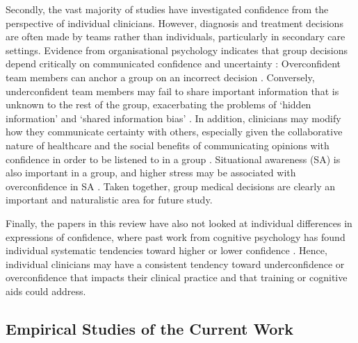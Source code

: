 \documentclass[a4paper, nobind]{templates/ociamthesis}
\begin{document}
\hfill\break
Secondly, the vast majority of studies have investigated confidence from the perspective of individual clinicians. However, diagnosis and treatment decisions are often made by teams rather than individuals, particularly in secondary care settings. Evidence from organisational psychology indicates that group decisions depend critically on communicated confidence and uncertainty \autocite{silver_wise_2021}: Overconfident team members can anchor a group on an incorrect decision \autocite{mahmoodi_equality_2015}. Conversely, underconfident team members may fail to share important information that is unknown to the rest of the group, exacerbating the problems of `hidden information' and `shared information bias' \autocite{stasser_pooling_1985}. In addition, clinicians may modify how they communicate certainty with others, especially given the collaborative nature of healthcare and the social benefits of communicating opinions with confidence in order to be listened to in a group \autocite{brezis_does_2019}. Situational awareness (SA) is also important in a group, and higher stress may be associated with overconfidence in SA \autocite{price_acute_2016}. Taken together, group medical decisions are clearly an important and naturalistic area for future study.

\hfill\break
Finally, the papers in this review have also not looked at individual differences in expressions of confidence, where past work from cognitive psychology has found individual systematic tendencies toward higher or lower confidence \autocite{ais_individual_2016,navajas_idiosyncratic_2017}. Hence, individual clinicians may have a consistent tendency toward underconfidence or overconfidence that impacts their clinical practice and that training or cognitive aids could address.

\subsection{Empirical Studies of the Current Work}\label{empirical-studies-of-the-current-work}
\end{document}

